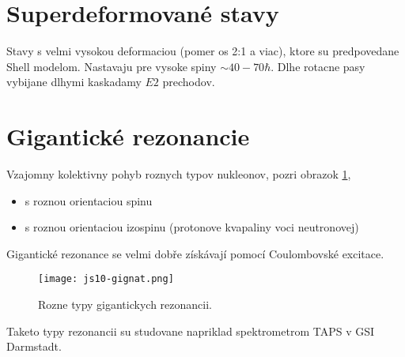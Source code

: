 \documentclass[../../main.tex]{subfiles}
\begin{document}
\section{Superdeformované stavy}
Stavy s velmi vysokou deformaciou (pomer os 2:1 a viac), ktore su predpovedane Shell modelom. Nastavaju pre vysoke spiny $\sim 40-70 \hbar$. Dlhe rotacne pasy vybijane dlhymi kaskadamy $E2$ prechodov.
\section{Gigantické rezonancie}
Vzajomny kolektivny pohyb roznych typov nukleonov, pozri obrazok \ref{js10:gigant},
\begin{itemize}
	\item s roznou orientaciou spinu
	\item s roznou orientaciou izospinu (protonove kvapaliny voci neutronovej)
\end{itemize}
Gigantické rezonance se velmi dobře získávají pomocí Coulombovské excitace.
\begin{figure}[!h]
\centerline{\texttt{[image: js10-gignat.png]}}
\caption{Rozne typy gigantickych rezonancii.}
\label{js10:gigant}
\end{figure}
Taketo typy rezonancii su studovane napriklad spektrometrom TAPS v GSI Darmstadt.
\end{document}
